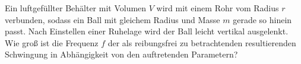 \begin{Exercise}[label = Luftschwingung, title = Luftschwingung, difficulty = 3, origin = Vorbereitungsaufgaben für die 3. Runde zur 47. IPhO 2016]
Ein luftgefüllter Behälter mit Volumen $V$ wird mit einem Rohr vom Radius $r$ verbunden, sodass ein Ball
mit gleichem Radius und Masse $m$ gerade so hinein passt. Nach
Einstellen einer Ruhelage wird der Ball leicht vertikal ausgelenkt.\\
Wie groß ist die Frequenz $f$ der als reibungsfrei zu betrachtenden
resultierenden Schwingung in Abhängigkeit von den auftretenden
Parametern?
\end{Exercise}
